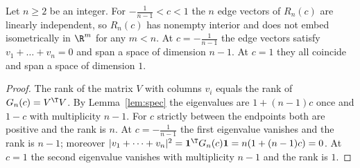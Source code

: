 \begin{theorem}\label{thm:main}
Let $n\ge2$ be an integer. For $-\frac{1}{n-1}<c<1$ the $n$ edge vectors of $R_n(c)$ are linearly independent, so $R_n(c)$ has nonempty interior and does not embed isometrically in $\R^m$ for any $m<n$.
At $c=-\frac{1}{n-1}$ the edge vectors satisfy $v_1+\dots+v_n=0$ and span a space of dimension $n-1$.
At $c=1$ they all coincide and span a space of dimension $1$.
\end{theorem}
\begin{proof}
The rank of the matrix $V$ with columns $v_i$ equals the rank of $G_n(c)=V^\T V$.
By Lemma~\ref{lem:spec} the eigenvalues are $1+(n-1)c$ once and $1-c$ with multiplicity $n-1$.
For $c$ strictly between the endpoints both are positive and the rank is $n$.
At $c=-\frac{1}{n-1}$ the first eigenvalue vanishes and the rank is $n-1$; moreover $|v_1+\dots+v_n|^2=\mathbf 1^\T G_n(c)\mathbf 1=n(1+(n-1)c)=0$.
At $c=1$ the second eigenvalue vanishes with multiplicity $n-1$ and the rank is $1$.
\end{proof}
